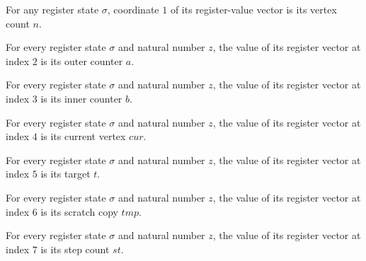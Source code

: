 \begin{lemma}
\label{Complexity.LogProg.UReg.v_1}
\leanok
{}
For any register state $\sigma$, coordinate $1$ of its register-value vector is its
vertex count $n$.
\end{lemma}

\begin{lemma}
\label{Complexity.LogProg.UReg.v_2}
\leanok
{}
For every register state $\sigma$ and natural number $z$, the value of its register
vector at index $2$ is its outer counter $a$.
\end{lemma}

\begin{lemma}
\label{Complexity.LogProg.UReg.v_3}
\leanok
{}
For every register state $\sigma$ and natural number $z$, the value of its register
vector at index $3$ is its inner counter $b$.
\end{lemma}

\begin{lemma}
\label{Complexity.LogProg.UReg.v_4}
\leanok
{}
For every register state $\sigma$ and natural number $z$, the value of its register
vector at index $4$ is its current vertex $cur$.
\end{lemma}

\begin{lemma}
\label{Complexity.LogProg.UReg.v_5}
\leanok
{}
For every register state $\sigma$ and natural number $z$, the value of its register
vector at index $5$ is its target $t$.
\end{lemma}

\begin{lemma}
\label{Complexity.LogProg.UReg.v_6}
\leanok
{}
For every register state $\sigma$ and natural number $z$, the value of its register
vector at index $6$ is its scratch copy $tmp$.
\end{lemma}

\begin{lemma}
\label{Complexity.LogProg.UReg.v_7}
\leanok
{}
For every register state $\sigma$ and natural number $z$, the value of its register
vector at index $7$ is its step count $st$.
\end{lemma}

